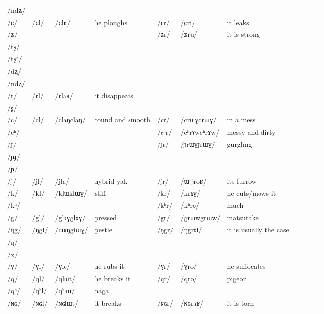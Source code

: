 \documentclass[oldfontcommands,oneside,a4paper,11pt]{article}
\newcommand{\ipa}[1]{{\phon/#1/}} %
\newcommand{\deux}[1]{/#1/}
\newcommand{\tib}[1]{\cellcolor{lightgray}\textbf{#1}}
\newcommand{\idph}[1]{\cellcolor{gray}\textbf{#1}}
\begin{document}
\begin{table}
{\begin{tabular}{l|lll|lll|lll|l}
\ipa{ndʑ} 	&  	&  	&  	&  	&  	& \\	
\ipa{ɕ} 	& \deux{ɕl} 	& \ipa{ɕlu} 	&he ploughs  	& \deux{ɕr} 	& \ipa{ɕri} 	& it leaks\\	
\ipa{ʑ} 	&  	&   	&  	& \deux{ʑr} 	& \ipa{ʑru} 	&it is strong \\	
\ipa{tʂ} 	&  	&  	&  	&  	&  	& \\	
\ipa{tʂʰ} 	&  	&  	&  	&  	&  	& \\	
\ipa{dʐ} 	&  	&  	&  	&  	&  	& \\	
\ipa{ndʐ} 	&  	&  	&  	&  	&  	& \\	
\ipa{r} 	& \deux{rl} 	& \ipa{rlaʁ} 	&it disappears  	&  	&  	& \\	
\ipa{ʂ} 	&  	&  	&  	&  	&  	& \\	
\ipa{c} 	& \deux{cl} \idph{}	& \ipa{claŋclaŋ} 	& round and smooth 	& \deux{cr} \idph{}	& \ipa{crɯɣcrɯɣ} 	& in a mess \\	
\ipa{cʰ} 	&  	&  	&  	& \deux{cʰr}\idph{} 	& \ipa{cʰrɤwcʰrɤw} 	& messy and dirty\\	
\ipa{ɟ} 	&  	&  	&  	& \deux{ɟr} \idph{}	& \ipa{ɟrɯɣɟrɯɣ} 	& gurgling\\	
\ipa{ɲɟ} 	&  	&  	&  	&  	&  	& \\	
\ipa{ɲ} 	&  	&  	&  	&  	&  	& \\	
\ipa{j} 	& \deux{jl} 	& \ipa{jla} 	& hybrid yak 	& \deux{jr} 	& \ipa{ɯ-jroʁ} 	&its furrow \\	
\ipa{k} 	& \deux{kl} 	& \ipa{klɯklɯɣ} 	&stiff  	& \deux{kr} 	& \ipa{krɤɣ} 	& he cuts/mows it\\	
\ipa{kʰ} 	&  	&  	&  	& \deux{kʰr} 	& \ipa{kʰro} 	&much \\	
\ipa{g} 	& \deux{gl} \idph{}	& \ipa{glɤɣglɤɣ} 	& pressed 	& \deux{gr} 	& \ipa{grɯwgrɯw} 	&matsutake \\	
\ipa{ŋg} 	& \deux{ŋgl} 	& \ipa{cɯŋglɯɣ} 	&pestle  	& \deux{ŋgr} 	& \ipa{ŋgrɤl} 	&it is usually the case \\	
\ipa{ŋ} 	&  	&  	&  	&  	&  	& \\	
\ipa{x} 	&  	&  	&  	&  	&  	& \\	
\ipa{ɣ} 	& \deux{ɣl} 	& \ipa{ɣle} 	&he rubs it  	& \deux{ɣr} 	& \ipa{ɣro} 	& he suffocates\\	
\ipa{q} 	& \deux{ql} 	& \ipa{qlɯt} 	& he breaks it 	& \deux{qr} 	& \ipa{qro} 	& pigeon\\	
\ipa{qʰ} 	& \deux{qʰl} \tib{}	& \ipa{qʰlɯ} 	&naga  	&  	&  	& \\	
\ipa{ɴɢ} 	& \deux{ɴɢl} 	& \ipa{ɴɢlɯt} 	& it breaks 	& \deux{ɴɢr} 	& \ipa{ɴɢraʁ} 	&it is torn \\	

\end{tabular}}
\end{table}
\end{document}
